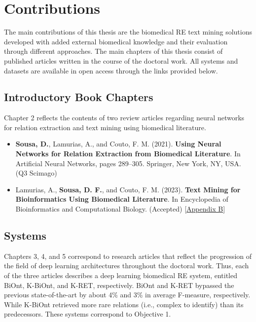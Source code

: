 \section{Contributions}

The main contributions of this thesis are the biomedical RE text mining solutions developed with added external biomedical knowledge and their evaluation through different approaches. The main chapters of this thesis consist of published articles written in the course of the doctoral work. All systems and datasets are available in open access through the links provided below. 

\subsection{Introductory Book Chapters}

Chapter 2 reflects the contents of two review articles regarding neural networks for relation extraction and text mining using biomedical literature.

\begin{itemize}
    \item{\textbf{Sousa, D.}, Lamurias, A., and Couto, F. M. (2021). \textbf{Using Neural Networks for Relation Extraction from Biomedical Literature}. In Artificial Neural Networks, pages 289–305. Springer, New York, NY, USA. (Q3 Scimago) \citep{sousa2021using}}
\end{itemize}

\begin{itemize}
    \item{Lamurias, A., \textbf{Sousa, D. F.}, and Couto, F. M. (2023). \textbf{Text Mining for Bioinformatics Using Biomedical Literature}. In Encyclopedia of Bioinformatics and Computational Biology. (Accepted) [\hyperlink{AB}{Appendix B}}] 
\end{itemize}

\subsection{Systems}

Chapters 3, 4, and 5 correspond to research articles that reflect the progression of the field of deep learning architectures throughout the doctoral work. Thus, each of the three articles describes a deep learning biomedical RE system, entitled BiOnt, K-BiOnt, and K-RET, respectively. BiOnt and K-RET bypassed the previous state-of-the-art by about 4\% and 3\% in average F-measure, respectively. While K-BiOnt retrieved more rare relations (i.e., complex to identify) than its predecessors. These systems correspond to Objective 1. 

